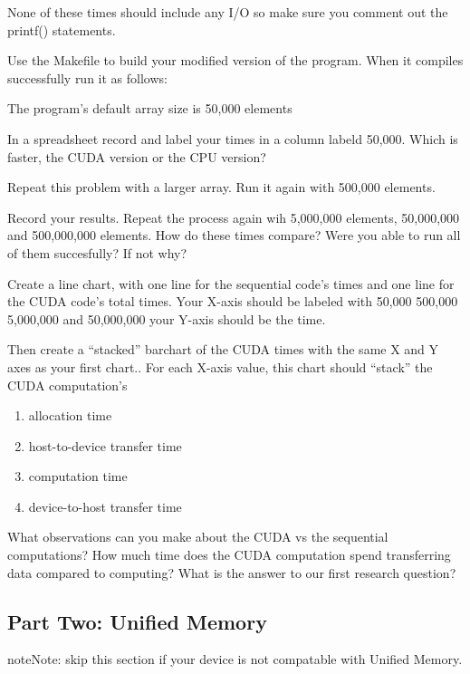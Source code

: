 \documentclass[letterpaper,10pt,openany,oneside]{sphinxmanual}
\begin{document}
None of these times should include any I/O so make sure you comment out
the printf() statements.

Use the Makefile to build your modified version of the program.
When it compiles successfully run it as follows:


The program's default array size is 50,000 elements

In a spreadsheet record and label your times in a column labeld 50,000. Which
is faster, the CUDA version or the CPU version?

Repeat this problem with a larger array. Run it again with 500,000 elements.


Record your results. Repeat the process again wih 5,000,000 elements,
50,000,000 and 500,000,000 elements. How do these times compare?
Were you able to run all of them succesfully? If not why?

Create a line chart, with one line for the sequential code's
times and one line for the CUDA code's total times.
Your X-axis should be labeled with 50,000 500,000
5,000,000 and 50,000,000 your Y-axis should be the time.

Then create a ``stacked'' barchart of the CUDA times with the same X and Y axes
as your first chart.. For each X-axis value, this chart should ``stack''
the CUDA computation's
\begin{enumerate}
\item {} 
allocation time

\item {} 
host-to-device transfer time

\item {} 
computation time

\item {} 
device-to-host transfer time

\end{enumerate}

What observations can you make about the CUDA vs the sequential computations?
How much time does the CUDA computation spend transferring data compared to computing?
What is the answer to our first research question?


\subsection{Part Two: Unified Memory}
\label{1-VectorAdd/VectorAdd:part-two-unified-memory}
\begin{notice}{note}{Note:}
skip this section if your device is not compatable with Unified Memory.
\end{notice}
\end{document}
